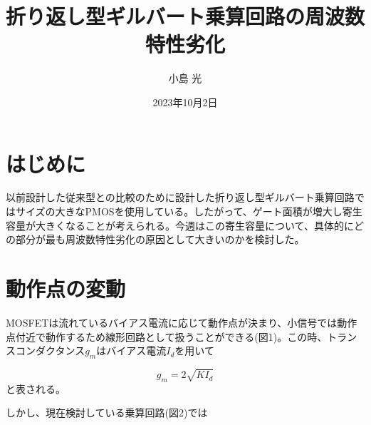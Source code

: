 \documentclass[twocolumn]{jsarticle}
\begin{document}
\title{折り返し型ギルバート乗算回路の周波数特性劣化}
\author{小島 光}
\date{2023年10月2日}
\maketitle

\section{はじめに}
以前設計した従来型との比較のために設計した折り返し型ギルバート乗算回路ではサイズの大きなPMOSを使用している。したがって、ゲート面積が増大し寄生容量が大きくなることが考えられる。今週はこの寄生容量について、具体的にどの部分が最も周波数特性劣化の原因として大きいのかを検討した。

\section{動作点の変動}
MOSFETは流れているバイアス電流に応じて動作点が決まり、小信号では動作点付近で動作するため線形回路として扱うことができる(図1)。この時、トランスコンダクタンス$g_{m}$はバイアス電流$I_{d}$を用いて



\begin{equation}
    g_{m}=2\sqrt{KI_{d}}
\end{equation}
と表される。\par
しかし、現在検討している乗算回路(図2)では
\end{document}
